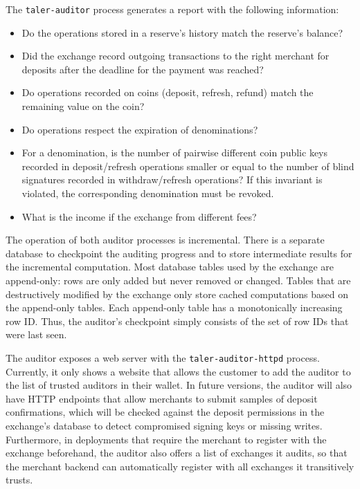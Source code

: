 The \texttt{taler-auditor} process generates a report with the following information:
\begin{itemize}
  \item Do the operations stored in a reserve's history match the reserve's balance?
  \item Did the exchange record outgoing transactions to the right merchant for
    deposits after the deadline for the payment was reached?
  \item Do operations recorded on coins (deposit, refresh, refund) match the remaining
    value on the coin?
  \item Do operations respect the expiration of denominations?
  \item For a denomination, is the number of pairwise different coin public
    keys recorded in deposit/refresh operations smaller or equal to the number
    of blind signatures recorded in withdraw/refresh operations?
    If this invariant is violated, the corresponding denomination must be revoked.
  \item What is the income if the exchange from different fees?
\end{itemize}

The operation of both auditor processes is incremental.  There is a separate
database to checkpoint the auditing progress and to store intermediate results
for the incremental computation.  Most database tables used by the exchange are
append-only:  rows are only added but never removed or changed.  Tables that
are destructively modified by the exchange only store cached computations based
on the append-only tables.  Each append-only table has a monotonically
increasing row ID.  Thus, the auditor's checkpoint simply consists of the set of
row IDs that were last seen.

The auditor exposes a web server with the \texttt{taler-auditor-httpd} process.
Currently, it only shows a website that allows the customer to add the auditor
to the list of trusted auditors in their wallet.  In future versions, the
auditor will also have HTTP endpoints that allow merchants to submit samples of
deposit confirmations, which will be checked against the deposit permissions in
the exchange's database to detect compromised signing keys or missing writes.
Furthermore, in deployments that require the merchant to register with the
exchange beforehand, the auditor also offers a list of exchanges it audits, so that
the merchant backend can automatically register with all exchanges it transitively trusts.

